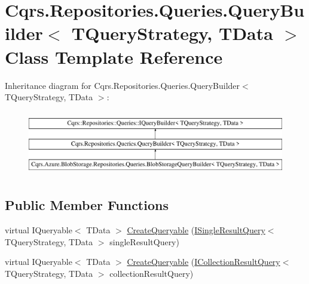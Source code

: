 \hypertarget{classCqrs_1_1Repositories_1_1Queries_1_1QueryBuilder}{}\section{Cqrs.\+Repositories.\+Queries.\+Query\+Builder$<$ T\+Query\+Strategy, T\+Data $>$ Class Template Reference}
\label{classCqrs_1_1Repositories_1_1Queries_1_1QueryBuilder}
Inheritance diagram for Cqrs.\+Repositories.\+Queries.\+Query\+Builder$<$ T\+Query\+Strategy, T\+Data $>$\+:\begin{figure}[H]
\begin{center}
\leavevmode
\includegraphics[height=2.876712cm]{classCqrs_1_1Repositories_1_1Queries_1_1QueryBuilder}
\end{center}
\end{figure}
\subsection*{Public Member Functions}
\begin{DoxyCompactItemize}
\item 
virtual I\+Queryable$<$ T\+Data $>$ \hyperlink{classCqrs_1_1Repositories_1_1Queries_1_1QueryBuilder_a6b103726f538e81ca0489a51b1aa3c88_a6b103726f538e81ca0489a51b1aa3c88}{Create\+Queryable} (\hyperlink{interfaceCqrs_1_1Repositories_1_1Queries_1_1ISingleResultQuery}{I\+Single\+Result\+Query}$<$ T\+Query\+Strategy, T\+Data $>$ single\+Result\+Query)
\item 
virtual I\+Queryable$<$ T\+Data $>$ \hyperlink{classCqrs_1_1Repositories_1_1Queries_1_1QueryBuilder_af8860edf3677cb80ae481f17ff2db9b5_af8860edf3677cb80ae481f17ff2db9b5}{Create\+Queryable} (\hyperlink{interfaceCqrs_1_1Repositories_1_1Queries_1_1ICollectionResultQuery}{I\+Collection\+Result\+Query}$<$ T\+Query\+Strategy, T\+Data $>$ collection\+Result\+Query)
\end{DoxyCompactItemize}

